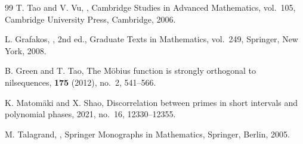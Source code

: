 \documentclass[11pt]{scrartcl}
\numberwithin{equation}{section}
\theoremstyle{definition}
\newcommand{\1}{\mathbf 1}
\begin{document}
\begin{thebibliography}{99}
T. Tao and V. Vu,
,
\newblock Cambridge Studies in Advanced Mathematics, vol.~105,
\newblock Cambridge University Press, Cambridge, 2006.

L. Grafakos,
,
\newblock 2nd ed., Graduate Texts in Mathematics, vol.~249,
\newblock Springer, New York, 2008.

B. Green and T. Tao,
\newblock The M\"obius function is strongly orthogonal to nilsequences,
 \textbf{175} (2012), no.~2, 541--566.

K. Matom\"aki and X. Shao,
\newblock Discorrelation between primes in short intervals and polynomial phases,
 2021, no.~16, 12330--12355.

M. Talagrand,
,
\newblock Springer Monographs in Mathematics,
\newblock Springer, Berlin, 2005.
\end{thebibliography}
\end{document}

